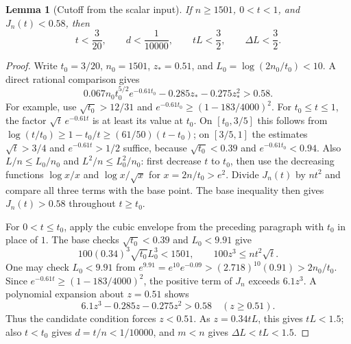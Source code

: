 \documentclass[11pt]{article}
\newtheorem{lemma}[theorem]{Lemma}
\begin{document}
	\begin{lemma}[Cutoff from the scalar input]\label{lem:cutoff}
		If $n\geq1501$, $0<t<1$, and $J_n(t)<0.58$, then
		\[
		t<\frac3{20},\qquad d<\frac1{10000},\qquad
		tL<\frac32,\qquad \Delta L<\frac32.
		\]
	\end{lemma}
	\begin{proof}
		Write $t_0=3/20$, $n_0=1501$, $z_*=0.51$, and
		$L_0=\log(2n_0/t_0)<10$.  A direct rational comparison gives
		\[
		0.067n_0t_0^{5/2}e^{-0.61t_0}
		-0.285z_*-0.275z_*^2>0.58.
		\]
		For example, use $\sqrt{t_0}>12/31$ and
		$e^{-0.61t_0}\geq(1-183/4000)^2$.
		For $t_0\leq t\leq1$, the factor
		$\sqrt t\,e^{-0.61t}$ is at least its value at $t_0$.
		On $[t_0,3/5]$ this follows from
		$\log(t/t_0)\geq1-t_0/t\geq(61/50)(t-t_0)$;
		on $[3/5,1]$ the estimates
		$\sqrt t>3/4$ and $e^{-0.61t}>1/2$ suffice,
		because $\sqrt{t_0}<0.39$ and $e^{-0.61t_0}<0.94$.
		Also $L/n\leq L_0/n_0$ and $L^2/n\leq L_0^2/n_0$:
		first decrease $t$ to $t_0$, then use the decreasing functions
		$\log x/x$ and $\log x/\sqrt x$ for
		$x=2n/t_0>e^2$.  Divide $J_n(t)$ by $nt^2$ and
		compare all three terms with the base point.  The base inequality
		then gives $J_n(t)>0.58$ throughout $t\geq t_0$.
		
		For $0<t\leq t_0$, apply the cubic envelope from the preceding
		paragraph with $t_0$ in place of $1$.  The base checks
		$\sqrt{t_0}<0.39$ and
		$L_0<9.91$ give
		\[
		100(0.34)^3\sqrt{t_0}L_0^3<1501,
		\qquad 100z^3\leq nt^2\sqrt t.
		\]
		One may check $L_0<9.91$ from
		$e^{9.91}=e^{10}e^{-0.09}>
		(2.718)^{10}(0.91)>2n_0/t_0$.
		Since $e^{-0.61t}\geq(1-183/4000)^2$, the positive
		term of $J_n$ exceeds $6.1z^3$.  A polynomial expansion
		about $z=0.51$ shows
		\[
		6.1z^3-0.285z-0.275z^2>0.58
		\quad(z\geq0.51).
		\]
		Thus the candidate condition forces $z<0.51$.
		As $z=0.34tL$, this gives $tL<1.5$; also
		$t<t_0$ gives $d=t/n<1/10000$, and $m<n$
		gives $\Delta L<tL<1.5$.
	\end{proof}
	
\end{document}
